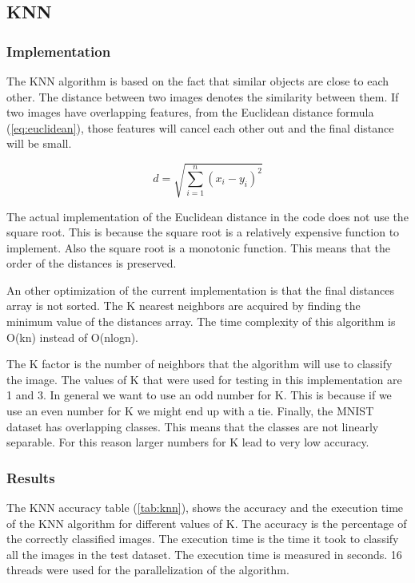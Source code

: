 \subsection{KNN}
\subsubsection{Implementation}

The KNN algorithm is based on the fact that similar objects are close to each other. The distance between two images
denotes the similarity between them. If two images have overlapping features, from the Euclidean distance formula 
(\ref{eq:euclidean}), those features will cancel each other out and the final distance will be small.

\begin{equation}
    d = \sqrt{\sum_{i=1}^{n} (x_i - y_i)^2}
    \label{eq:euclidean}
\end{equation}

The actual implementation of the Euclidean distance in the code does not use the square root. This is because the square root
is a relatively expensive function to implement. Also the square root is a monotonic function. This means that the order of the
distances is preserved.

An other optimization of the current implementation is that the final distances array is not sorted. The
K nearest neighbors are acquired by finding the minimum value of the distances array. The time complexity of this algorithm is
O(kn) instead of O(nlogn).

The K factor is the number of neighbors that the algorithm will use to classify the image. The values of K that were used for 
testing in this implementation are 1 and 3. In general we want to use an odd number for K. This is because if we use an even
number for K we might end up with a tie. Finally, the MNIST dataset has overlapping classes. This means that the classes are
not linearly separable. For this reason larger numbers for K lead to very low accuracy.

\subsubsection{Results}

The KNN accuracy table (\ref{tab:knn}), shows the accuracy and the execution time of the KNN algorithm for different values of K.
The accuracy is the percentage of the correctly classified images. The execution time is the time it took to classify all the
images in the test dataset. The execution time is measured in seconds. 16 threads were used for the parallelization of the algorithm.

